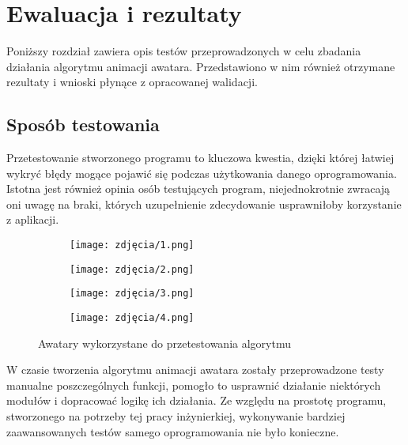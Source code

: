 \chapter{Ewaluacja i rezultaty}
\label{cha:ewaluacjaIRezultaty}
Poniższy rozdział zawiera opis testów przeprowadzonych w celu zbadania działania algorytmu animacji awatara. Przedstawiono w nim również otrzymane rezultaty i wnioski płynące z opracowanej walidacji.


\section{Sposób testowania}
Przetestowanie stworzonego programu to kluczowa kwestia, dzięki której łatwiej wykryć błędy mogące pojawić się podczas użytkowania danego oprogramowania. Istotna jest również opinia osób testujących program, niejednokrotnie zwracają oni uwagę na braki, których uzupełnienie zdecydowanie usprawniłoby korzystanie z aplikacji.

\begin{figure}[h]
	\centering
	\begin{subfigure}{0.35\textwidth}
		\centering
		\texttt{[image: zdjęcia/1.png]}
		\subcaption{\label{avatar_1}}
	\end{subfigure}
	\begin{subfigure}{0.35\textwidth}
		\centering
		\texttt{[image: zdjęcia/2.png]}
		\subcaption{\label{avatar_2}}
	\end{subfigure}
	\begin{subfigure}{0.35\textwidth}
		\centering
		\texttt{[image: zdjęcia/3.png]}
		\subcaption{\label{avatar_3}}
	\end{subfigure}
	\begin{subfigure}{0.35\textwidth}
		\centering
		\texttt{[image: zdjęcia/4.png]}
		\subcaption{\label{avatar_4}}
	\end{subfigure}
	
	\caption{\label{fig:avatars}Awatary wykorzystane do przetestowania algorytmu}
\end{figure}

W czasie tworzenia algorytmu animacji awatara zostały przeprowadzone testy manualne poszczególnych funkcji, pomogło to usprawnić działanie niektórych modułów i dopracować logikę ich działania. Ze względu na prostotę programu, stworzonego na potrzeby tej pracy inżynierkiej, wykonywanie bardziej zaawansowanych testów samego oprogramowania nie było konieczne.

